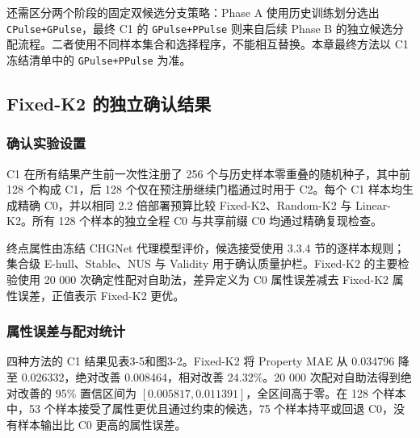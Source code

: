 还需区分两个阶段的固定双候选分支策略：Phase A 使用历史训练划分选出 \texttt{CPulse+GPulse}，最终 C1 的 \texttt{GPulse+PPulse} 则来自后续 Phase B 的独立候选分配流程。二者使用不同样本集合和选择程序，不能相互替换。本章最终方法以 C1 冻结清单中的 \texttt{GPulse+PPulse} 为准。

\subsection{Fixed-K2 的独立确认结果}

\subsubsection{确认实验设置}

C1 在所有结果产生前一次性注册了 256 个与历史样本零重叠的随机种子，其中前 128 个构成 C1，后 128 个仅在预注册继续门槛通过时用于 C2。每个 C1 样本均生成精确 C0，并以相同 2.2 倍部署预算比较 Fixed-K2、Random-\allowbreak K2 与 Linear-K2。所有 128 个样本的独立全程 C0 与共享前缀 C0 均通过精确复现检查。

终点属性由冻结 CHGNet 代理模型评价，候选接受使用 3.3.4 节的逐样本规则；集合级 E-hull、Stable、NUS 与 Validity 用于确认质量护栏。Fixed-K2 的主要检验使用 20 000 次确定性配对自助法，差异定义为 C0 属性误差减去 Fixed-K2 属性误差，正值表示 Fixed-K2 更优。

\subsubsection{属性误差与配对统计}

四种方法的 C1 结果见表3-5和图3-2。Fixed-K2 将 Property MAE 从 0.034796 降至 0.026332，绝对改善 0.008464，相对改善 24.32\%。20 000 次配对自助法得到绝对改善的 95\% 置信区间为 \([0.005817,0.011391]\)，全区间高于零。在 128 个样本中，53 个样本接受了属性更优且通过约束的候选，75 个样本持平或回退 C0，没有样本输出比 C0 更高的属性误差。


